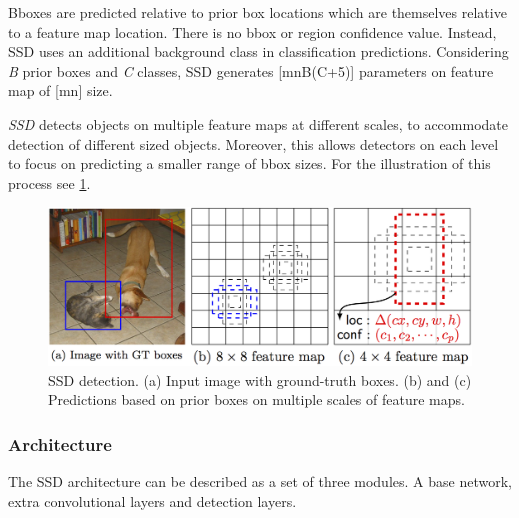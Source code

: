 Bboxes are predicted relative to prior box locations which are themselves relative to a feature map location. There is no bbox or region confidence value. Instead, SSD uses an additional background class in classification predictions. Considering \textit{B} prior boxes and \textit{C} classes, SSD generates [m\x n\x B\x (C+5)] parameters on feature map of [m\x n] size.

\textit{SSD} detects objects on multiple feature maps at different scales, to accommodate detection of different sized objects. Moreover, this allows detectors on each level to focus on predicting a smaller range of bbox sizes. For the illustration of this process see \cref{fig:ssddet}.

\begin{figure}
    \centering
    \includegraphics[width=\textwidth]{img/ssddet}
    \caption[SSD detection]%
    {SSD detection. (a) Input image with ground-truth boxes. (b) and (c) Predictions based on prior boxes on multiple scales of feature maps.}
    \label{fig:ssddet}
\end{figure}

\subsubsection{Architecture}
The SSD architecture can be described as a set of three modules. A base network, extra convolutional layers and detection layers.

